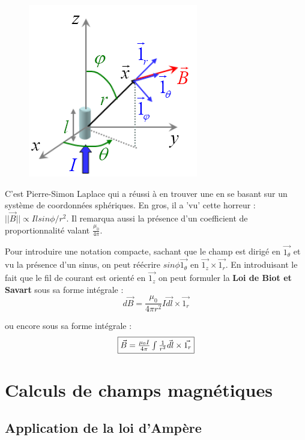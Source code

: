\documentclass	[11pt, a4paper, openany]{book}
\begin{document}
\begin{figure}
\includegraphics[scale=0.55]{magneto/image6.png}
\end{figure}

C'est Pierre-Simon Laplace qui a réussi à en trouver une en se basant sur un système de coordonnées sphériques. En gros, il a 'vu' cette  horreur : $ ||\vec{B}|| \propto Il sin\phi / r^2$. Il remarqua aussi la présence d'un coefficient de proportionnalité valant $\frac{\mu_0}{4\pi}$.



Pour introduire une notation compacte, sachant que le champ est dirigé en $\vec{1_\theta}$ et vu la présence d'un sinus, on peut réécrire $sin\phi \vec{1_\theta}$ en $\vec{1_z} \times \vec{1_r}$. En introduisant le fait que le fil de courant est orienté en $\vec{1_z}$ on peut formuler la \textbf{Loi de Biot et Savart} sous sa forme intégrale :
\begin{equation}
d\vec{B} = \frac{\mu_0}{4\pi r^2}I\vec{dl} \times \vec{1_r}
\end{equation}

ou encore sous sa forme intégrale :
\begin{equation}
\fbox{$\vec{B} = \frac{\mu_0 I}{4\pi} \int \frac{1}{r^2}\vec{dl} \times \vec{1_r}$}
\end{equation}


\section{Calculs de champs magnétiques}
\subsection{Application de la loi d'Ampère}
\end{document}

